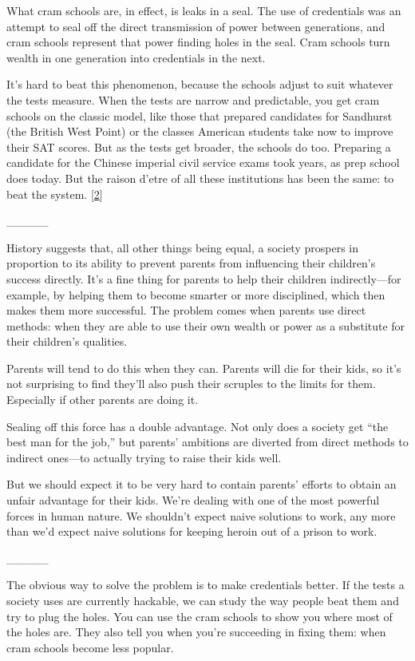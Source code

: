 What cram schools are, in effect, is leaks in a seal. The use of
credentials was an attempt to seal off the direct transmission of power
between generations, and cram schools represent that power finding holes
in the seal. Cram schools turn wealth in one generation into credentials
in the next.

It's hard to beat this phenomenon, because the schools adjust to suit
whatever the tests measure. When the tests are narrow and predictable,
you get cram schools on the classic model, like those that prepared
candidates for Sandhurst (the British West Point) or the classes
American students take now to improve their SAT scores. But as the tests
get broader, the schools do too. Preparing a candidate for the Chinese
imperial civil service exams took years, as prep school does today. But
the raison d'etre of all these institutions has been the same: to beat
the system. {[}\hyperref[f2n]{2}{]}

\_\_\_\_\_

History suggests that, all other things being equal, a society prospers
in proportion to its ability to prevent parents from influencing their
children's success directly. It's a fine thing for parents to help their
children indirectly---for example, by helping them to become smarter or
more disciplined, which then makes them more successful. The problem
comes when parents use direct methods: when they are able to use their
own wealth or power as a substitute for their children's qualities.

Parents will tend to do this when they can. Parents will die for their
kids, so it's not surprising to find they'll also push their scruples to
the limits for them. Especially if other parents are doing it.

Sealing off this force has a double advantage. Not only does a society
get ``the best man for the job,'' but parents' ambitions are diverted
from direct methods to indirect ones---to actually trying to raise their
kids well.

But we should expect it to be very hard to contain parents' efforts to
obtain an unfair advantage for their kids. We're dealing with one of the
most powerful forces in human nature. We shouldn't expect naive
solutions to work, any more than we'd expect naive solutions for keeping
heroin out of a prison to work.

\_\_\_\_\_

The obvious way to solve the problem is to make credentials better. If
the tests a society uses are currently hackable, we can study the way
people beat them and try to plug the holes. You can use the cram schools
to show you where most of the holes are. They also tell you when you're
succeeding in fixing them: when cram schools become less popular.

